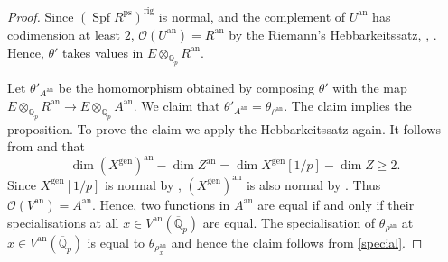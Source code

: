 \documentclass{amsart}
\theoremstyle{definition}
\theoremstyle{remark}
\newcommand{\Qp}{\mathbb {Q}_p}
\newcommand{\Qpbar}{\overline{\mathbb{Q}}_p}
\newcommand{\OO}{\mathcal O}
\newcommand{\ana}{\mathrm{an}}
\newcommand{\gen}{\mathrm{gen}}
\DeclareMathOperator{\Spf}{Spf}
\newcommand{\rig}{\mathrm{rig}}
\newcommand{\ps}{\mathrm{ps}}
\begin{document}
\begin{proof}
Since $(\Spf R^{\ps})^{\rig}$ is normal, and the complement of $U^{\ana}$  has codimension  at 
least $2$, $\OO(U^{\ana})=R^{\ana}$ by the 
Riemann's Hebbarkeitssatz, \cite[Satz 10]{bartenwerfer}, 
\cite[Proposition 2.13]{lutkebohmert}. Hence, $\theta'$ takes 
values in $E\otimes_{\Qp} R^{\ana}$.

Let $\theta'_{A^{\ana}}$ be the homomorphism obtained by composing 
$\theta'$ with the map 
$E\otimes_{\Qp} R^{\ana}\rightarrow 
E\otimes_{\Qp} A^{\ana}$. We claim 
that $\theta'_{A^{\ana}}= \theta_{\rho^{\ana}}$. 
The claim implies the proposition. 
To prove the claim we apply the Hebbarkeitssatz again. 
It follows from  and  that 
\begin{equation}
\dim (X^{\gen})^{\ana} -\dim Z^{\ana} = \dim X^{\gen}[1/p] - \dim Z \ge 2.
\end{equation} 
Since $X^{\gen}[1/p]$ is normal by \cite[Corollary 15.23]{defG}, $(X^{\gen})^{\ana}$ is also normal by . Thus 
$\OO(V^{\ana})= A^{\ana}$. Hence, two functions in $A^{\ana}$ are equal if and only if their specialisations
at all $x\in V^{\ana}(\Qpbar)$ are equal. The specialisation of $\theta_{\rho^{\ana}}$ at $x\in V^{\ana}(\Qpbar)$ is equal to $\theta_{\rho^{\ana}_x}$ and hence the claim follows from \eqref{special}.
\end{proof}
\end{document}
